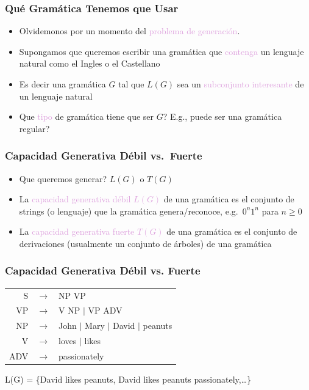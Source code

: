 \documentclass[compress,color=usenames]{beamer}
\newcommand{\mH}[1]{\textcolor{Plum}{#1}}
\begin{document}
\begin{frame}
\frametitle{Qu\'e Gram\'atica Tenemos que Usar}

\begin{itemize}
\item Olvidemonos por un momento del \mH{problema de generaci\'on}.
\item Supongamos que queremos escribir una gram\'atica que \mH{contenga} un lenguaje natural como el Ingles o 
el Castellano
\item Es decir una gram\'atica $G$ tal que $L(G)$ sea un \mH{subconjunto interesante} de un lenguaje natural
\item Que \mH{tipo} de gram\'atica tiene que ser $G$? E.g., puede ser una gram\'atica regular? 
\end{itemize}
\end{frame}


\begin{frame}
\frametitle{Capacidad Generativa D\'ebil vs.\ Fuerte}

\begin{itemize}
\item Que queremos generar? $L(G)$ o $T(G)$

\item La \mH{capacidad generativa d\'ebil $L(G)$} de una gram\'atica es el 
conjunto de strings (o lenguaje) que la gram\'atica genera/reconoce, e.g.\ $0^n1^n$ para $n \geq 0$

\item La \mH{capacidad generativa fuerte $T(G)$} de una gram\'atica es el 
conjunto de derivaciones (usualmente un conjunto de \'arboles) de una gram\'atica
\end{itemize}
\end{frame}

\begin{frame}
\frametitle{Capacidad Generativa D\'ebil vs. Fuerte}

\begin{center}
\begin{tabular}{rcl}
  S & $\rightarrow$ & NP VP \\

 VP & $\rightarrow$ & V NP $\mid$ VP ADV  \\

 NP & $\rightarrow$ & John $\mid$ Mary $\mid$ David $\mid$ peanuts \\

  V & $\rightarrow$ &  loves $\mid$ likes\\

ADV & $\rightarrow$ & passionately 
\end{tabular}
\end{center}


L(G) = \{David likes peanuts, David likes peanuts passionately,\ldots\}

\end{frame}
\end{document}
